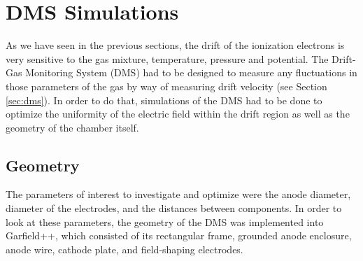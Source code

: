 \section{DMS Simulations} 
\label{sec:dms_sims}
As we have seen in the previous sections, the drift of the ionization electrons is very sensitive to the gas mixture, temperature, pressure and potential. The Drift-Gas Monitoring System (DMS) had to be designed to measure any fluctuations in those parameters of the gas by way of measuring drift velocity (see Section \ref{sec:dms}). In order to do that, simulations of the DMS had to be done to optimize the uniformity of the electric field within the drift region as well as the geometry of the chamber itself.
\subsection{Geometry} 
The parameters of interest to investigate and optimize were the anode diameter, diameter of the electrodes, and the distances between components. In order to look at these parameters, the geometry of the DMS was implemented into Garfield++, which consisted of its rectangular frame, grounded anode enclosure, anode wire, cathode plate, and field-shaping electrodes. 

